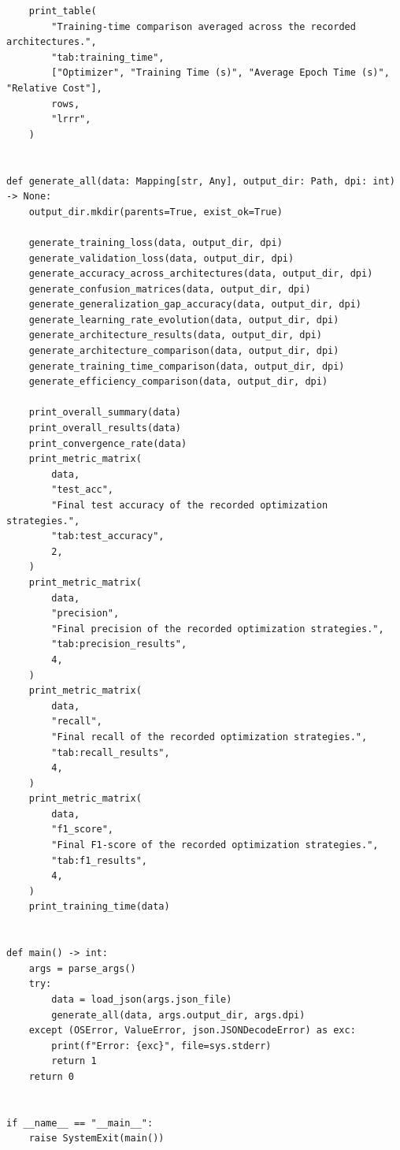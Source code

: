 \begin{verbatim}
    print_table(
        "Training-time comparison averaged across the recorded architectures.",
        "tab:training_time",
        ["Optimizer", "Training Time (s)", "Average Epoch Time (s)", "Relative Cost"],
        rows,
        "lrrr",
    )


def generate_all(data: Mapping[str, Any], output_dir: Path, dpi: int) -> None:
    output_dir.mkdir(parents=True, exist_ok=True)

    generate_training_loss(data, output_dir, dpi)
    generate_validation_loss(data, output_dir, dpi)
    generate_accuracy_across_architectures(data, output_dir, dpi)
    generate_confusion_matrices(data, output_dir, dpi)
    generate_generalization_gap_accuracy(data, output_dir, dpi)
    generate_learning_rate_evolution(data, output_dir, dpi)
    generate_architecture_results(data, output_dir, dpi)
    generate_architecture_comparison(data, output_dir, dpi)
    generate_training_time_comparison(data, output_dir, dpi)
    generate_efficiency_comparison(data, output_dir, dpi)

    print_overall_summary(data)
    print_overall_results(data)
    print_convergence_rate(data)
    print_metric_matrix(
        data,
        "test_acc",
        "Final test accuracy of the recorded optimization strategies.",
        "tab:test_accuracy",
        2,
    )
    print_metric_matrix(
        data,
        "precision",
        "Final precision of the recorded optimization strategies.",
        "tab:precision_results",
        4,
    )
    print_metric_matrix(
        data,
        "recall",
        "Final recall of the recorded optimization strategies.",
        "tab:recall_results",
        4,
    )
    print_metric_matrix(
        data,
        "f1_score",
        "Final F1-score of the recorded optimization strategies.",
        "tab:f1_results",
        4,
    )
    print_training_time(data)


def main() -> int:
    args = parse_args()
    try:
        data = load_json(args.json_file)
        generate_all(data, args.output_dir, args.dpi)
    except (OSError, ValueError, json.JSONDecodeError) as exc:
        print(f"Error: {exc}", file=sys.stderr)
        return 1
    return 0


if __name__ == "__main__":
    raise SystemExit(main())

\end{verbatim}
